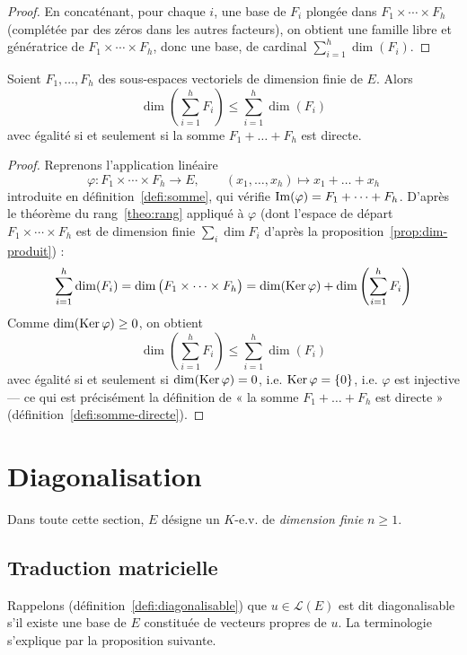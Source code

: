 \begin{proof}
En concaténant, pour chaque $i$, une base de $F_i$ plongée dans $F_1\times\cdots\times F_h$ (complétée par des zéros dans les autres facteurs), on obtient une famille libre et génératrice de $F_1\times\cdots\times F_h$, donc une base, de cardinal $\sum_{i=1}^h \dim(F_i)$.
\end{proof}

\begin{prop}
\label{prop:dim-somme}
Soient $F_1,\dots,F_h$ des sous-espaces vectoriels de dimension finie de $E$. Alors
\[\dim\left(\sum_{i=1}^h F_i\right) \leq \sum_{i=1}^h \dim(F_i)\]
avec égalité si et seulement si la somme $F_1+\dots+F_h$ est directe.
\end{prop}

\begin{proof}
Reprenons l'application linéaire
\[\varphi : F_1\times\cdots\times F_h \to E, \qquad (x_1,\dots,x_h)\mapsto x_1+\dots+x_h\]
introduite en définition~\ref{defi:somme}, qui vérifie $\operatorname{Im}(\varphi) = F_1+\dots+F_h$. D'après le théorème du rang~\ref{theo:rang} appliqué à $\varphi$ (dont l'espace de départ $F_1\times\cdots\times F_h$ est de dimension finie $\sum_i\dim F_i$ d'après la proposition~\ref{prop:dim-produit}) :
\[\sum_{i=1}^h \dim(F_i) = \dim\big(F_1\times\cdots\times F_h\big) = \dim(\operatorname{Ker}\varphi) + \dim\left(\sum_{i=1}^h F_i\right)\]
Comme $\dim(\operatorname{Ker}\varphi)\geq 0$, on obtient
\[\dim\left(\sum_{i=1}^h F_i\right) \leq \sum_{i=1}^h \dim(F_i)\]
avec égalité si et seulement si $\dim(\operatorname{Ker}\varphi)=0$, i.e. $\operatorname{Ker}\varphi=\{0\}$, i.e. $\varphi$ est injective — ce qui est précisément la définition de « la somme $F_1+\dots+F_h$ est directe » (définition~\ref{defi:somme-directe}).
\end{proof}

\section{Diagonalisation}

Dans toute cette section, $E$ désigne un $K$-e.v. de \emph{dimension finie} $n\geq 1$.

\subsection{Traduction matricielle}

Rappelons (définition~\ref{defi:diagonalisable}) que $u\in\mathcal{L}(E)$ est dit diagonalisable s'il existe une base de $E$ constituée de vecteurs propres de $u$. La terminologie s'explique par la proposition suivante.


